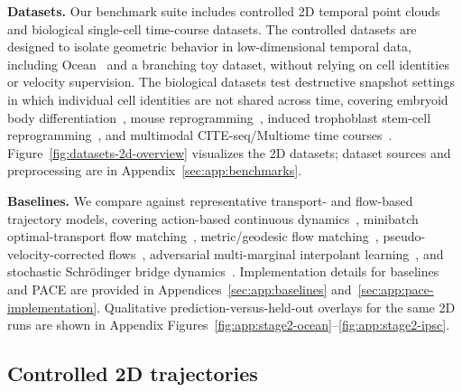 \textbf{Datasets. }
Our benchmark suite includes controlled 2D temporal point clouds and biological single-cell time-course datasets.
The controlled datasets are designed to isolate geometric behavior in low-dimensional temporal data, including Ocean~\citep{shen2025multimarginal,petrovic2026curly} and a branching toy dataset, without relying on cell identities or velocity supervision.
The biological datasets test destructive snapshot settings in which individual cell identities are not shared across time, covering embryoid body differentiation~\citep{moon2019visualizing}, mouse reprogramming~\citep{schiebinger2019optimal}, induced trophoblast stem-cell reprogramming~\citep{liu2020reprogramming}, and multimodal CITE-seq/Multiome time courses~\citep{lance2022multimodal}.
Figure~\ref{fig:datasets-2d-overview} visualizes the 2D datasets; dataset sources and preprocessing are in Appendix~\ref{sec:app:benchmarks}.

\textbf{Baselines. }
We compare against representative transport- and flow-based trajectory models, covering action-based continuous dynamics~\citep{neklyudov2023action}, minibatch optimal-transport flow matching~\citep{tong2023conditional}, metric/geodesic flow matching~\citep{kapusniak2024metric}, pseudo-velocity-corrected flows~\citep{petrovic2026curly}, adversarial multi-marginal interpolant learning~\citep{kviman2026multimarginal}, and stochastic Schr\"odinger bridge dynamics~\citep{chen2023deep}.
Implementation details for baselines and PACE are provided in Appendices~\ref{sec:app:baselines} and~\ref{sec:app:pace-implementation}.
Qualitative prediction-versus-held-out overlays for the same 2D runs are shown in Appendix Figures~\ref{fig:app:stage2-ocean}--\ref{fig:app:stage2-ipsc}.



\subsection{Controlled 2D trajectories}

